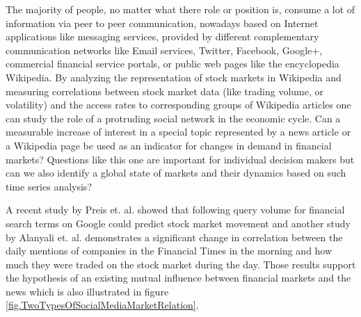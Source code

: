 \documentclass[a4paper,10pt]{scrbook}
\begin{document}


\label{ext.fig.CommunicationProcessesAndCouplesNetworks} 

The majority of people, no matter what there role or position is, consume a lot of information via peer to peer communication, nowadays based on Internet applications like messaging services, provided by different complementary communication networks like Email services, Twitter, Facebook, Google+, commercial financial service portals, or public web pages like the encyclopedia Wikipedia. By analyzing the representation of stock markets in Wikipedia and measuring correlations between stock market data (like trading volume, or volatility) and the access rates to corresponding groups of Wikipedia articles one can study the role of a protruding social network in the economic cycle. Can a measurable increase of interest in a special topic represented by a news article or a Wikipedia page be used as an indicator for changes in demand in financial markets? Questions like this one are important for individual decision makers but can we also identify a global state of markets  and their dynamics based on such time series analysis?

A recent study by Preis et. al. \cite{Preis.GoogleStockMarketRelation} 
showed that following query volume for financial search terms on Google could predict stock market movement and another study by  Alanyali et. al. 
 \cite{Alanyali.GoogleStockMarketRelation} 
demonstrates a significant change in correlation between the daily mentions of companies in the Financial Times in the morning and how much they were traded on the stock market during the day. Those results support the hypothesis of an existing mutual influence between financial markets and the news which is also illustrated in figure \ref{fig.TwoTypesOfSocialMediaMarketRelation}.
\end{document}
